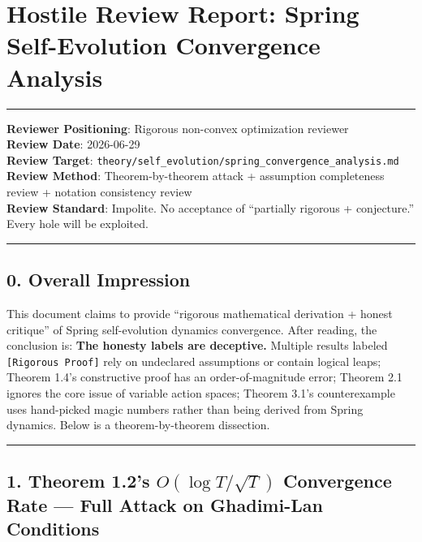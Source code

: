 \documentclass[
  12pt,
]{article}
\author{SCX}
\date{2026}
\begin{document}
\section{Hostile Review Report: Spring Self-Evolution Convergence Analysis}\label{spring-hostile-review}

\begin{center}\rule{0.5\linewidth}{0.5pt}\end{center}

\textbf{Reviewer Positioning}: Rigorous non-convex optimization reviewer\\
\textbf{Review Date}: 2026-06-29\\
\textbf{Review Target}: \texttt{theory/self\_evolution/spring\_convergence\_analysis.md}\\
\textbf{Review Method}: Theorem-by-theorem attack + assumption completeness review + notation consistency review\\
\textbf{Review Standard}: Impolite. No acceptance of ``partially rigorous + conjecture.'' Every hole will be exploited.

\begin{center}\rule{0.5\linewidth}{0.5pt}\end{center}

\subsection{0. Overall Impression}\label{overall-impression}

This document claims to provide ``rigorous mathematical derivation + honest critique'' of Spring self-evolution dynamics convergence. After reading, the conclusion is: \textbf{The honesty labels are deceptive.} Multiple results labeled \texttt{[Rigorous Proof]} rely on undeclared assumptions or contain logical leaps; Theorem 1.4's constructive proof has an order-of-magnitude error; Theorem 2.1 ignores the core issue of variable action spaces; Theorem 3.1's counterexample uses hand-picked magic numbers rather than being derived from Spring dynamics. Below is a theorem-by-theorem dissection.

\begin{center}\rule{0.5\linewidth}{0.5pt}\end{center}

\subsection{1. Theorem 1.2's $O(\log T/\sqrt{T})$ Convergence Rate --- Full Attack on Ghadimi-Lan Conditions}\label{attack-thm-1.2}
\end{document}
